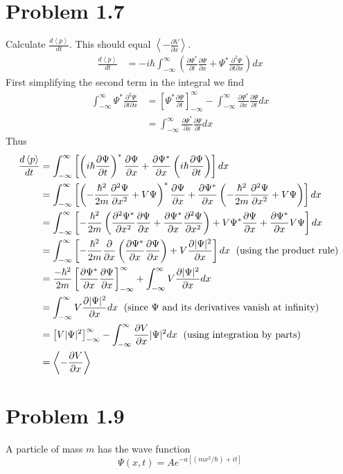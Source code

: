 \documentclass{article}
\newcommand{\ddt}[1]{\frac{\partial #1}{\partial t}}
\newcommand{\ddx}[1]{\frac{\partial #1}{\partial x}}
\newcommand{\dddx}[1]{\frac{\partial^2 #1}{\partial x^2}}
\newcommand{\bracket}[1]{\left[ #1 \right]}
\newcommand{\paren}[1]{\left( #1 \right)}
\newcommand{\braket}[1]{\left\langle #1 \right\rangle}
\newcommand{\intinf}{\int_{-\infty}^\infty}
\begin{document}
\section{Problem 1.7}
Calculate $\frac{d\braket{p}}{dt}$. This should equal $\braket{-\frac{\partial V}{\partial x}}$.
\begin{align*}
  \frac{d\braket{p}}{dt} &= -i\hbar \intinf \paren{\ddt{\Psi^*} \ddx{\Psi} + \Psi^* \frac{\partial^2 \Psi}{\partial t \partial x}}dx
\end{align*}
First simplifying the second term in the integral we find
\begin{align*}
  \intinf \Psi^* \frac{\partial^2 \Psi}{\partial t \partial x} &= \bracket{\Psi^* \ddt\Psi}^{\infty}_{-\infty} - \intinf \ddx{\Psi^*} \ddt{\Psi} dx \\
                                                               &= \intinf \ddx{\Psi^*} \ddt{\Psi} dx
\end{align*}
Thus
\begin{align*}
  \frac{d\braket{p}}{dt} &= \intinf \bracket{\paren{i\hbar \ddt{\Psi}}^* \ddx{\Psi} + \ddx{\Psi^*}\paren{i\hbar\ddt{\Psi}}}dx \\
                         &= \intinf \bracket{\paren{-\frac{\hbar^2}{2m} \dddx{\Psi} + V \Psi}^*\ddx{\Psi} + \ddx{\Psi^*} \paren{-\frac{\hbar^2}{2m} \dddx{\Psi} + V \Psi}}dx \\
                         &= \intinf \bracket{-\frac{\hbar^2}{2m} \paren{\dddx{\Psi^*} \ddx\Psi + \ddx{\Psi^*} \dddx\Psi} + V \Psi^* \ddx\Psi + \ddx{\Psi^*} V \Psi}dx \\
                         &= \intinf \bracket{-\frac{\hbar^2}{2m} \ddx{} \paren{\ddx{\Psi^*} \ddx{\Psi}} + V \ddx{|\Psi|^2}}dx \text{\; (using the product rule) } \\
                         &= \frac{-\hbar^2}{2m}\bracket{\ddx{\Psi^*}\ddx\Psi}^\infty_{-\infty} + \intinf V \ddx{|\Psi|^2}dx \\
                         &= \intinf V \ddx{|\Psi|^2}dx \text{\; (since $\Psi$ and its derivatives vanish at infinity)}\\
                         &= \bracket{V|\Psi|^2}^\infty_{-\infty} - \intinf \ddx{V}|\Psi|^2 dx \text{\; (using integration by parts)} \\
                         &= \braket{-\ddx{V}}
\end{align*}

\section{Problem 1.9}
A particle of mass $m$ has the wave function
\[ \Psi(x,t) = Ae^{-a\bracket{(mx^2/\hbar) + it}} \]
\end{document}
